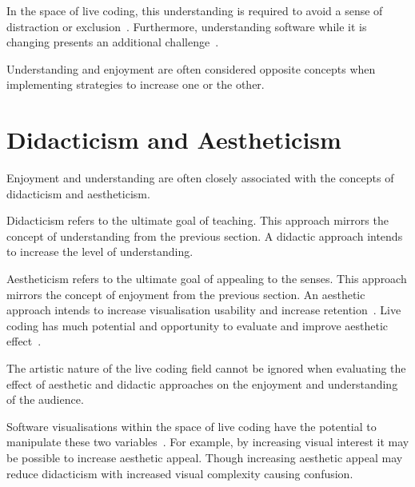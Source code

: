 In the space of live coding, this understanding is required to avoid a sense of distraction or exclusion~\cite{McLean2010a}. Furthermore, understanding software while it is changing presents an additional challenge~\cite{Eisenbarth2003}.

Understanding and enjoyment are often considered opposite concepts when implementing strategies to increase one or the other. 

\section{Didacticism and Aestheticism}

Enjoyment and understanding are often closely associated with the concepts of didacticism and aestheticism.

Didacticism refers to the ultimate goal of teaching. This approach mirrors the concept of understanding from the previous section. A didactic approach intends to increase the level of understanding.

Aestheticism refers to the ultimate goal of appealing to the senses. This approach mirrors the concept of enjoyment from the previous section. An aesthetic approach intends to increase visualisation usability and increase retention~\cite{Cawthon2007}. Live coding has much potential and opportunity to evaluate and improve aesthetic effect~\cite{Bell}.

The artistic nature of the live coding field cannot be ignored when evaluating the effect of aesthetic and didactic approaches on the enjoyment and understanding of the audience.

Software visualisations within the space of live coding have the potential to manipulate these two variables~\cite{Iru,McLean2010a}. For example, by increasing visual interest it may be possible to increase aesthetic appeal. Though increasing aesthetic appeal may reduce didacticism with increased visual complexity causing confusion.

